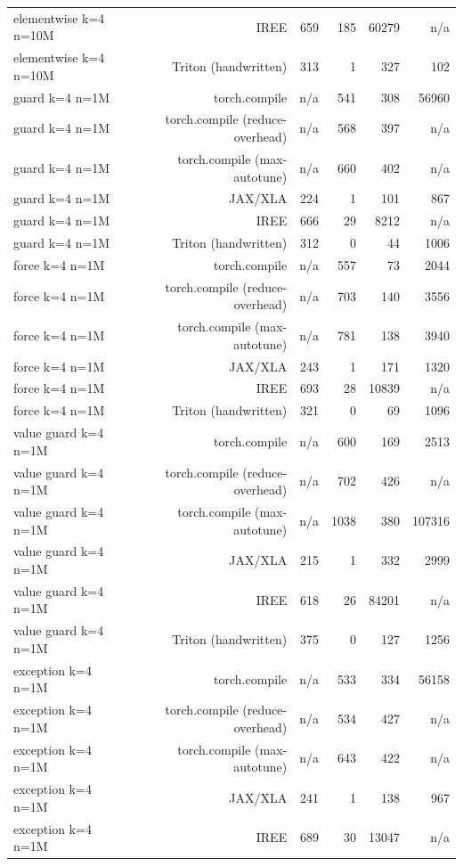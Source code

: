 \begin{tabular}{lrrrrr}
elementwise k=4 n=10M & IREE & 659 & 185 & 60279 & n/a \\
elementwise k=4 n=10M & Triton (handwritten) & 313 & 1 & 327 & 102 \\
guard k=4 n=1M & torch.compile & n/a & 541 & 308 & 56960 \\
guard k=4 n=1M & torch.compile (reduce-overhead) & n/a & 568 & 397 & n/a \\
guard k=4 n=1M & torch.compile (max-autotune) & n/a & 660 & 402 & n/a \\
guard k=4 n=1M & JAX/XLA & 224 & 1 & 101 & 867 \\
guard k=4 n=1M & IREE & 666 & 29 & 8212 & n/a \\
guard k=4 n=1M & Triton (handwritten) & 312 & 0 & 44 & 1006 \\
force k=4 n=1M & torch.compile & n/a & 557 & 73 & 2044 \\
force k=4 n=1M & torch.compile (reduce-overhead) & n/a & 703 & 140 & 3556 \\
force k=4 n=1M & torch.compile (max-autotune) & n/a & 781 & 138 & 3940 \\
force k=4 n=1M & JAX/XLA & 243 & 1 & 171 & 1320 \\
force k=4 n=1M & IREE & 693 & 28 & 10839 & n/a \\
force k=4 n=1M & Triton (handwritten) & 321 & 0 & 69 & 1096 \\
value guard k=4 n=1M & torch.compile & n/a & 600 & 169 & 2513 \\
value guard k=4 n=1M & torch.compile (reduce-overhead) & n/a & 702 & 426 & n/a \\
value guard k=4 n=1M & torch.compile (max-autotune) & n/a & 1038 & 380 & 107316 \\
value guard k=4 n=1M & JAX/XLA & 215 & 1 & 332 & 2999 \\
value guard k=4 n=1M & IREE & 618 & 26 & 84201 & n/a \\
value guard k=4 n=1M & Triton (handwritten) & 375 & 0 & 127 & 1256 \\
exception k=4 n=1M & torch.compile & n/a & 533 & 334 & 56158 \\
exception k=4 n=1M & torch.compile (reduce-overhead) & n/a & 534 & 427 & n/a \\
exception k=4 n=1M & torch.compile (max-autotune) & n/a & 643 & 422 & n/a \\
exception k=4 n=1M & JAX/XLA & 241 & 1 & 138 & 967 \\
exception k=4 n=1M & IREE & 689 & 30 & 13047 & n/a \\

\end{tabular}
